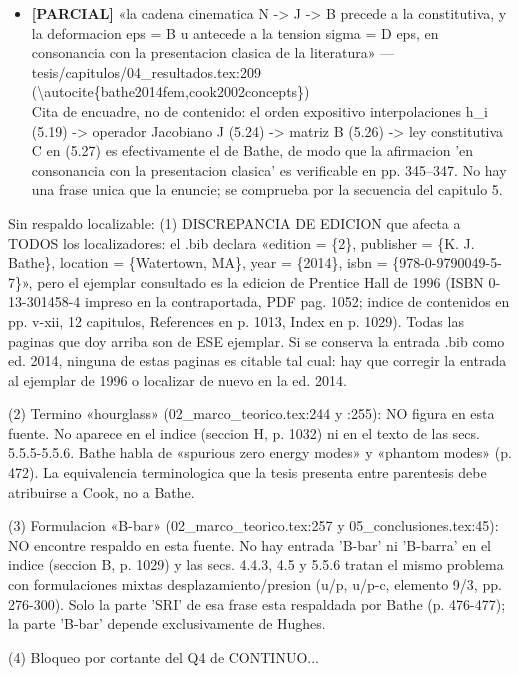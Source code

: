 \documentclass[11pt,a4paper]{article}
\newcommand{\campo}[1]{\textcolor{gris}{\footnotesize #1}}
\begin{document}
\begin{itemize}
\item \textbf{[PARCIAL]} «la cadena cinematica N -\textgreater{} J -\textgreater{} B precede a la constitutiva, y la deformacion eps = B u antecede a la tension sigma = D eps, en consonancia con la presentacion clasica de la literatura» --- tesis/capitulos/04\_resultados.tex:209 (\textbackslash{}autocite\{bathe2014fem,cook2002concepts\})
\\ \campo{Cita de encuadre, no de contenido: el orden expositivo interpolaciones h\_i (5.19) -\textgreater{} operador Jacobiano J (5.24) -\textgreater{} matriz B (5.26) -\textgreater{} ley constitutiva C en (5.27) es efectivamente el de Bathe, de modo que la afirmacion 'en consonancia con la presentacion clasica' es verificable en pp. 345--347. No hay una frase unica que la enuncie; se comprueba por la secuencia del capitulo 5.}
\end{itemize}
{\small\campo{Sin respaldo localizable:} (1) DISCREPANCIA DE EDICION que afecta a TODOS los localizadores: el .bib declara «edition = \{2\}, publisher = \{K. J. Bathe\}, location = \{Watertown, MA\}, year = \{2014\}, isbn = \{978-0-9790049-5-7\}», pero el ejemplar consultado es la edicion de Prentice Hall de 1996 (ISBN 0-13-301458-4 impreso en la contraportada, PDF pag. 1052; indice de contenidos en pp. v-xii, 12 capitulos, References en p. 1013, Index en p. 1029). Todas las paginas que doy arriba son de ESE ejemplar. Si se conserva la entrada .bib como ed. 2014, ninguna de estas paginas es citable tal cual: hay que corregir la entrada al ejemplar de 1996 o localizar de nuevo en la ed. 2014.

(2) Termino «hourglass» (02\_marco\_teorico.tex:244 y :255): NO figura en esta fuente. No aparece en el indice (seccion H, p. 1032) ni en el texto de las secs. 5.5.5-5.5.6. Bathe habla de «spurious zero energy modes» y «phantom modes» (p. 472). La equivalencia terminologica que la tesis presenta entre parentesis debe atribuirse a Cook, no a Bathe.

(3) Formulacion «B-bar» (02\_marco\_teorico.tex:257 y 05\_conclusiones.tex:45): NO encontre respaldo en esta fuente. No hay entrada 'B-bar' ni 'B-barra' en el indice (seccion B, p. 1029) y las secs. 4.4.3, 4.5 y 5.5.6 tratan el mismo problema con formulaciones mixtas desplazamiento/presion (u/p, u/p-c, elemento 9/3, pp. 276-300). Solo la parte 'SRI' de esa frase esta respaldada por Bathe (p. 476-477); la parte 'B-bar' depende exclusivamente de Hughes.

(4) Bloqueo por cortante del Q4 de CONTINUO...\par}
\end{document}
